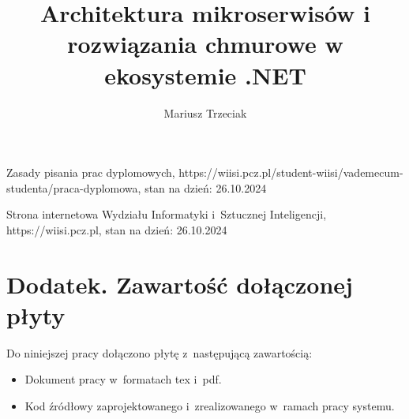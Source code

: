 \documentclass{PracaDyplomowa}
\author{Mariusz Trzeciak}
\title{Architektura mikroserwisów i rozwiązania chmurowe w ekosystemie .NET}
\begin{document}
\frontpage
\tableofcontents












\cleardoublepage
\begin{thebibliography}{99}


 Zasady pisania prac dyplomowych, https://wiisi.pcz.pl/student-wiisi/vademecum-studenta/praca-dyplomowa, stan na dzień: 26.10.2024

 Strona internetowa Wydziału Informatyki i~Sztucznej Inteligencji, https://wiisi.pcz.pl, stan na dzień: 26.10.2024

\end{thebibliography}

\chapter*{Dodatek. Zawartość dołączonej płyty}

Do niniejszej pracy dołączono płytę z~następującą zawartością:

\begin{itemize}
\item Dokument pracy w~formatach tex i~pdf.

\item Kod źródłowy zaprojektowanego i~zrealizowanego w~ramach pracy systemu.
\end{itemize}

\listoffigures
{}
\end{document}
